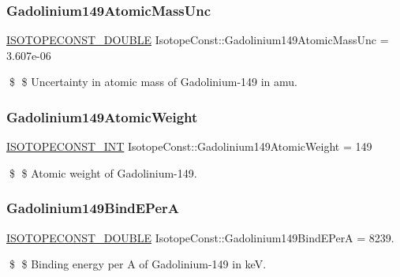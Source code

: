 \subsubsection{\texorpdfstring{Gadolinium149\+Atomic\+Mass\+Unc}{Gadolinium149AtomicMassUnc}}
{\footnotesize\ttfamily \mbox{\hyperlink{group___isotope_const-_macros_ga8f45a7272ce02c0b4c65c44636ed719a}{I\+S\+O\+T\+O\+P\+E\+C\+O\+N\+S\+T\+\_\+\+D\+O\+U\+B\+LE}} Isotope\+Const\+::\+Gadolinium149\+Atomic\+Mass\+Unc = 3.\+607e-\/06}

\$ \$ Uncertainty in atomic mass of Gadolinium-\/149 in amu. \mbox{\label{group___isotope_const-_gadolinium-_gd149_gaf5f32e852bda3c5669a7304e692b4409}} 
\subsubsection{\texorpdfstring{Gadolinium149\+Atomic\+Weight}{Gadolinium149AtomicWeight}}
{\footnotesize\ttfamily \mbox{\hyperlink{group___isotope_const-_macros_ga5f18360b3e99483a35c32d789e62621c}{I\+S\+O\+T\+O\+P\+E\+C\+O\+N\+S\+T\+\_\+\+I\+NT}} Isotope\+Const\+::\+Gadolinium149\+Atomic\+Weight = 149}

\$ \$ Atomic weight of Gadolinium-\/149. \mbox{\label{group___isotope_const-_gadolinium-_gd149_ga9ff328b7683886a3dd952894a39f248f}} 
\subsubsection{\texorpdfstring{Gadolinium149\+Bind\+E\+PerA}{Gadolinium149BindEPerA}}
{\footnotesize\ttfamily \mbox{\hyperlink{group___isotope_const-_macros_ga8f45a7272ce02c0b4c65c44636ed719a}{I\+S\+O\+T\+O\+P\+E\+C\+O\+N\+S\+T\+\_\+\+D\+O\+U\+B\+LE}} Isotope\+Const\+::\+Gadolinium149\+Bind\+E\+PerA = 8239.}

\$ \$ Binding energy per A of Gadolinium-\/149 in keV. \mbox{\label{group___isotope_const-_gadolinium-_gd149_ga4f2fd43e652a31504dd5a139dedc4673}} 
